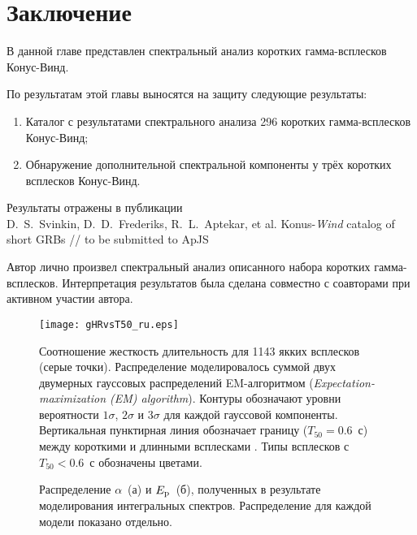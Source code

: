 \section{Заключение}
В данной главе представлен спектральный анализ коротких гамма-всплесков Конус-Винд.

По результатам этой главы выносятся на защиту следующие результаты:
\begin{enumerate}
\item Каталог с результатами спектрального анализа 296 коротких гамма-всплесков Конус-Винд;
\item Обнаружение дополнительной спектральной компоненты у трёх коротких всплесков Конус-Винд.
\end{enumerate}

Результаты отражены в публикации \\
D.~S.~Svinkin, D.~D.~Frederiks, R.~L.~Aptekar, et al. Konus-\textit{Wind} catalog of short GRBs //
to be submitted to ApJS

Автор лично произвел спектральный анализ описанного набора коротких гамма-всплесков.
Интерпретация результатов была сделана совместно с соавторами при активном участии автора.


\begin{figure}
    \begin{center}
        \texttt{[image: gHRvsT50\_ru.eps]}
    \end{center}
    \caption{
    Соотношение жесткость длительность для 1143 якких всплесков \kws (серые точки).
    Распределение моделировалось суммой двух двумерных гауссовых распределений
    EM-алгоритмом (\textit{Expectation-maximization (EM) algorithm}). 
    Контуры обозначают уровни вероятности $1\sigma$, $2\sigma$ и $3\sigma$ для каждой
    гауссовой компоненты. Вертикальная пунктирная линия обозначает границу ($T_{50}=0.6$~с)
    между короткими и длинными всплесками \kws. Типы всплесков с $T_{50}<0.6$~с 
    обозначены цветами.
    \label{fig:HRvsT50}}
\end{figure}

\begin{figure}
	\begin{minipage}[h]{0.5\textwidth}
    \end{minipage}
    \hfill
    \begin{minipage}[h]{0.5\textwidth}
	\end{minipage}
    \caption{
    Распределение $\alpha$~(а) и $E_{\mathrm{p}}$~(б), полученных 
    в результате моделирования интегральных спектров. Распределение для каждой модели
    показано отдельно.
    \label{fig:par_dist} }
\end{figure}


